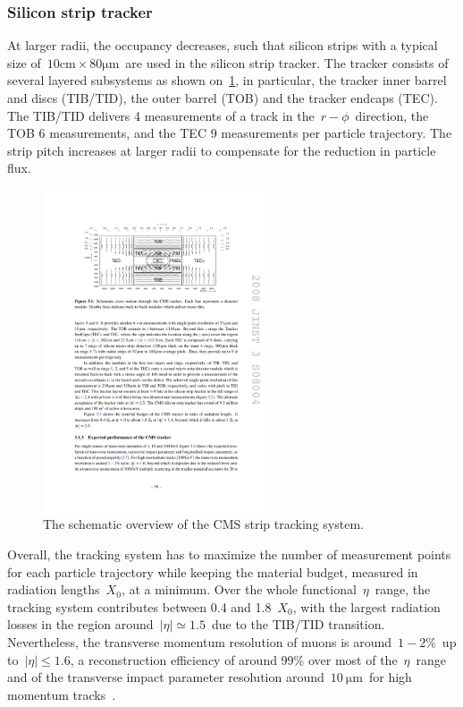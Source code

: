 \subsubsection{Silicon strip tracker}
At larger radii, the occupancy decreases, such that silicon strips with a typical size of~$10\mathrm{cm} \times 80\mathrm{\mu m}$~are used in the silicon strip tracker. The tracker consists of several layered subsystems as shown on~\cref{fig:cms_tracker}, in particular, the tracker inner barrel and discs (TIB/TID), the outer barrel (TOB) and the tracker endcaps (TEC). The TIB/TID delivers 4 measurements of a track in the~$r-\phi$~direction, the TOB 6 measurements, and the TEC 9 measurements per particle trajectory. The strip pitch increases at larger radii to compensate for the reduction in particle flux.

\begin{figure}
\begin{centering}
\includegraphics[width=0.6\textwidth]{figures/exp/tracker.pdf}
\caption[The CMS strip tracker]{The schematic overview of the CMS strip tracking system.}
\label{fig:cms_tracker}
\end{centering}
\end{figure}

Overall, the tracking system has to maximize the number of measurement points for each particle trajectory while keeping the material budget, measured in radiation lengths~$X_0$, at a minimum. Over the whole functional~$\eta$~range, the tracking system contributes between 0.4 and 1.8~$X_0$, with the largest radiation losses in the region around~$|\eta| \simeq 1.5$~due to the TIB/TID transition. Nevertheless, the transverse momentum resolution of muons is around~$1-2\%$~up to~$|\eta| \leq 1.6$, a reconstruction efficiency of around 99\% over most of the~$\eta$~range and of the transverse impact parameter resolution around~$10~\mathrm{\mu m}$~for high momentum tracks~\cite{Chatrchyan:2008aa}. 

